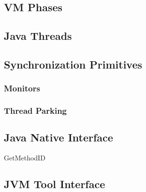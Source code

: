 


\subsection{VM Phases}


\subsection{Java Threads}



\subsection{Synchronization Primitives}



\subsubsection{Monitors}

\subsubsection{Thread Parking}

\subsection{Java Native Interface}


GetMethodID

\subsection{JVM Tool Interface}

